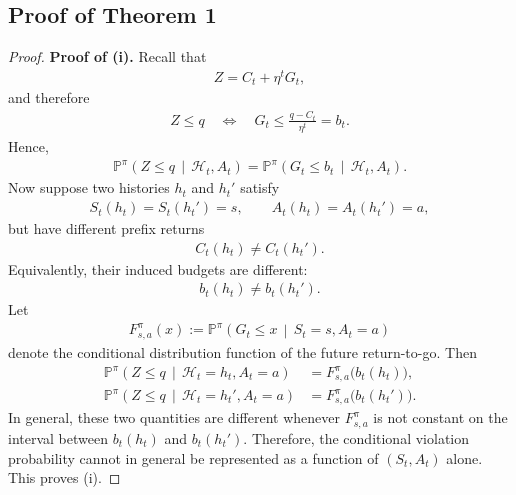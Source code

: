 \subsection{Proof of Theorem 1}
\begin{proof}
\medskip
\noindent\textbf{Proof of (i).}
Recall that
\begin{align}
    Z = C_t + \eta^t G_t,
\end{align}
and therefore
\begin{align}
    Z\le q
    \quad \Longleftrightarrow \quad
    G_t \le \frac{q-C_t}{\eta^t}
    =
    b_t.
\end{align}
Hence,
\begin{align}
    \mathbb{P}^{\pi}\!\left(
        Z\le q
        \,\middle|\,
        \mathcal{H}_t,A_t
    \right)
    =
    \mathbb{P}^{\pi}\!\left(
        G_t\le b_t
        \,\middle|\,
        \mathcal{H}_t,A_t
    \right).
\end{align}
Now suppose two histories $h_t$ and $h_t'$ satisfy
\begin{align}
    S_t(h_t)=S_t(h_t')=s,
    \qquad
    A_t(h_t)=A_t(h_t')=a,
\end{align}
but have different prefix returns
\begin{align}
    C_t(h_t)\neq C_t(h_t').
\end{align}
Equivalently, their induced budgets are different:
\begin{align}
    b_t(h_t)\neq b_t(h_t').
\end{align}
Let
\begin{align}
    F_{s,a}^{\pi}(x)
    :=
    \mathbb{P}^{\pi}\!\left(
        G_t\le x
        \,\middle|\,
        S_t=s,A_t=a
    \right)
\end{align}
denote the conditional distribution function of the future return-to-go. Then
\begin{align}
    \mathbb{P}^{\pi}\!\left(
        Z\le q
        \,\middle|\,
        \mathcal{H}_t=h_t,A_t=a
    \right)
    &=
    F_{s,a}^{\pi}\!\bigl(b_t(h_t)\bigr),\\
    \mathbb{P}^{\pi}\!\left(
        Z\le q
        \,\middle|\,
        \mathcal{H}_t=h_t',A_t=a
    \right)
    &=
    F_{s,a}^{\pi}\!\bigl(b_t(h_t')\bigr).
\end{align}
In general, these two quantities are different whenever $F_{s,a}^{\pi}$ is not constant on the interval between $b_t(h_t)$ and $b_t(h_t')$. Therefore, the conditional violation probability cannot in general be represented as a function of $(S_t,A_t)$ alone. This proves (i).


\end{proof}

